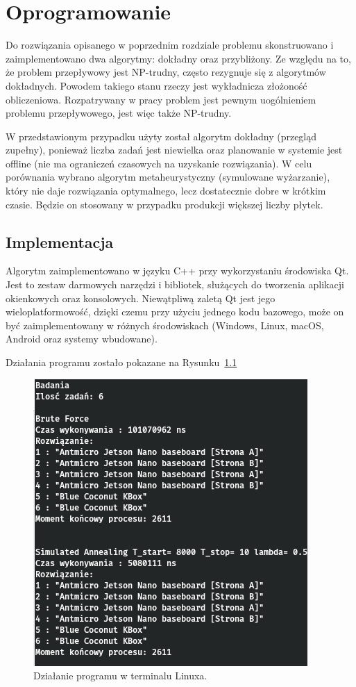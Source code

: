 \chapter{Oprogramowanie}

Do rozwiązania opisanego w poprzednim rozdziale problemu skonstruowano i zaimplementowano dwa algorytmy: dokładny oraz przybliżony.
Ze względu na to, że problem przepływowy jest NP-trudny, często rezygnuje się z algorytmów dokładnych. Powodem takiego stanu rzeczy jest wykładnicza złożoność obliczeniowa. Rozpatrywany w pracy problem jest pewnym uogólnieniem problemu przepływowego, jest więc także NP-trudny.

W przedstawionym przypadku użyty został algorytm dokładny (przegląd zupełny), ponieważ liczba zadań jest niewielka oraz planowanie w systemie jest offline (nie ma ograniczeń czasowych na uzyskanie rozwiązania).
W celu porównania wybrano algorytm metaheurystyczny (symulowane wyżarzanie), który nie daje rozwiązania optymalnego, lecz dostatecznie dobre w krótkim czasie. Będzie on stosowany w przypadku produkcji większej liczby płytek.

\section{Implementacja}
Algorytm zaimplementowano w języku C++ przy wykorzystaniu środowiska Qt. Jest to zestaw darmowych narzędzi i bibliotek, służących do tworzenia aplikacji okienkowych oraz konsolowych. Niewątpliwą zaletą Qt jest jego wieloplatformowość, dzięki czemu przy użyciu jednego kodu bazowego, może on być zaimplementowany w różnych środowiskach (Windows, Linux, macOS, Android oraz systemy wbudowane).

Działania programu zostało pokazane na Rysunku~\ref{app_out}

\begin{figure}[H]
	\centering
	\includegraphics[scale=0.622]{chapters/chapter4/app_out.png}
	\caption{Działanie programu w terminalu Linuxa.}
	\label{app_out}
\end{figure}

